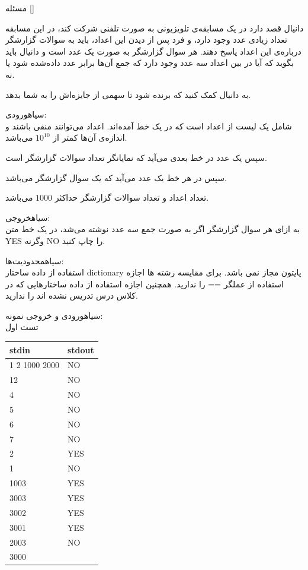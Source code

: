 ‌مسئله []

دانیال قصد دارد در یک مسابقه‌ی تلویزیونی به صورت تلفنی  شرکت کند، در این مسابقه تعداد زیادی عدد وجود دارد، و فرد پس از دیدن این اعداد، باید به سوالات گزارشگر درباره‌ی این اعداد پاسخ دهند. هر سوال گزارشگر به صورت یک عدد است و دانیال باید بگوید که آیا در بین اعداد سه عدد وجود دارد که جمع آن‌ها برابر عدد داده‌شده شود یا نه.
 
 به دانیال کمک کنید که برنده شود تا سهمی از جایزه‌اش را به شما بدهد.

‌سیاه{ورودی:}\\
شامل یک لیست از اعداد است که در یک خط آمده‌اند. اعداد می‌توانند منفی باشند و اندازه‌ی آن‌ها کمتر از
$10^10$
می‌باشد.

سپس یک عدد در خط بعدی می‌آید که نمایانگر تعداد سوالات گزارشگر است.

سپس در هر خط یک عدد می‌آید که یک سوال گزارشگر می‌باشد.

تعداد اعداد و تعداد سوالات گزارشگر حداکثر $1000$ می‌باشد.

‌سیاه{خروجی:}\\
به ازای هر سوال گزارشگر اگر به صورت جمع سه عدد نوشته می‌شد، در یک خط متن YES وگرنه NO را چاپ کنید.

‌سیاه{محدودیت‌ها:}\\
استفاده از داده ساختار dictionary پایتون مجاز نمی باشد. برای مقایسه رشته ها اجازه استفاده از عملگر == را ندارید. همچنین اجازه استفاده از داده ساختارهایی که در کلاس درس تدریس نشده اند را ندارید.

‌سیاه{ورودی و خروجی نمونه:}\\

تست اول
\begin{latin}
	\begin{tabularx}{\textwidth}{|X | X|}
		\hline
		\textbf{stdin} &
		\textbf{stdout}\\
		\hline
		1 2 1000 2000
 & NO\\
		12 & NO \\
4 & NO\\
5 & NO \\
6 & NO \\
7 & NO \\
2 & YES \\
1 & NO \\
1003 & YES \\
3003 & YES \\
3002 & YES \\
3001 & YES \\
2003 & NO \\
3000 & \\
		\hline
	\end{tabularx}
\end{latin}

